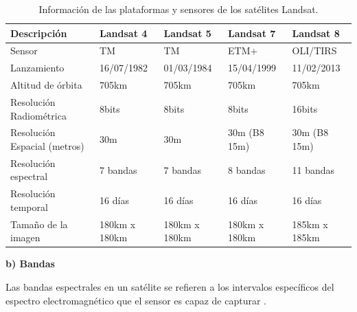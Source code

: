 \begin{table}[H]
    \caption{Información de las plataformas y sensores de los satélites Landsat.}
    \small
    \begin{tabularx}{1\textwidth}{YYYYY}
        \hline
        \textbf{Descripción}         & \textbf{Landsat 4} & \textbf{Landsat 5} & \textbf{Landsat 7} & \textbf{Landsat 8} \\ \hline
        Sensor                       & TM                 & TM                 & ETM+               & OLI/TIRS           \\ \hline
        Lanzamiento                  & 16/07/1982         & 01/03/1984         & 15/04/1999         & 11/02/2013         \\ \hline
        Altitud de órbita            & 705km              & 705km              & 705km              & 705km              \\ \hline
        Resolución Radiométrica      & 8bits              & 8bits              & 8bits              & 16bits             \\ \hline
        Resolución Espacial (metros) & 30m                & 30m                & 30m (B8 15m)       & 30m (B8 15m)       \\ \hline
        Resolución espectral         & 7 bandas           & 7 bandas           & 8 bandas           & 11 bandas          \\ \hline
        Resolución temporal          & 16 días            & 16 días            & 16 días            & 16 días            \\ \hline
        Tamaño de la imagen          & 180km x 180km      & 180km x 180km      & 180km x 180km      & 185km x 185km      \\ \hline
    \end{tabularx}
    \begin{minipage}{\textwidth}
        \vspace{10pt}
        \label{tab:ResolucionLandsat}
    \end{minipage}
\end{table}

\textbf{b) Bandas}

Las bandas espectrales en un satélite se refieren a los intervalos específicos del espectro electromagnético que el sensor es capaz de capturar \cite{chuvieco2016fundamentals}.

